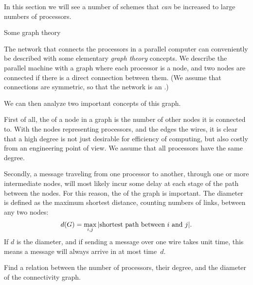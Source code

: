 In this section we will see a number of schemes that \emph{can} be
increased to large numbers of processors.

 {Some graph theory}
\label{sec:graph-theory}

The network that connects the processors in a parallel computer can
conveniently be described with some elementary \emph{graph
  theory} concepts. We
describe the parallel machine with a graph where each processor is a
node, and two nodes are connected if there is a direct connection
between them. (We assume that connections
  are symmetric, so that the network is an
  .)

We can then analyze two
important concepts of this graph.

First of all, the  of a node in a graph is the
number of other nodes it is connected to. With the nodes representing
processors, and the edges the wires, it is clear that a high degree
is not just desirable for efficiency of computing, but also costly
from an engineering point of view. We assume that all processors have
the same degree.

Secondly, a message traveling from one processor to another, through
one or more intermediate nodes, will most likely incur some delay at each
stage of the path between the nodes.
For this reason, the  of the
graph is important. The diameter is defined as the maximum shortest
distance, counting numbers of links, between any two nodes:
\[ d(G) = \max_{i,j}|\hbox{shortest path between $i$ and $j$}|. \]
If $d$ is the diameter,
and if sending a message over one wire takes unit time,
this means a message will always arrive in at most time~$d$.

\begin{exercise}
  Find a relation between the number of processors, their degree,
  and the diameter of the connectivity graph.
\end{exercise}

